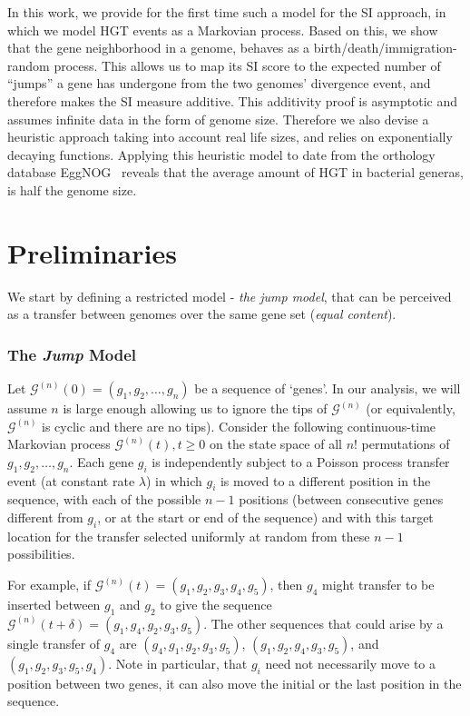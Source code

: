 \documentclass[runningheads, 11pt]{llncs}
\newcommand{\G}{\mathcal{G}^{(n)}}
\begin{document}
In this work, we provide for the first time such a model for the SI approach, in
which we model HGT events as a Markovian process. Based on this, we show that
the gene neighborhood in a genome, behaves as a birth/death/immigration-random
process. This allows us to map its SI score to the expected number of ``jumps''
a gene has undergone from the two genomes' divergence event, and therefore makes
the SI measure additive. This additivity proof is asymptotic and assumes
infinite data in the form of genome size. Therefore we also devise a heuristic
approach taking into account real life sizes, and relies on exponentially
decaying functions. Applying this heuristic model to date from the orthology
database EggNOG~\cite{Powell12} reveals that the average amount of HGT in
bacterial generas, is half the genome size.

\section{Preliminaries}
\label{sec-prelim}
We start by defining a restricted model - {\em the jump model}, that can be
perceived as a transfer between genomes over the same gene set ({\em equal
content}). \subsubsection{The {\em Jump} Model} Let $\G(0) = (g_1, g_2, \ldots,
g_n)$ be a sequence of `genes'. {In our analysis,} we will assume $n$ is large
enough allowing us to ignore the tips of $\G$ (or equivalently, $\G$ is cyclic
and there are no tips). Consider the following continuous-time Markovian process
$\G(t), t\geq 0$ on the state space of all $n!$ permutations of $g_1, g_2,
\ldots, g_n$. Each gene $g_i$ is independently subject to a Poisson process
transfer event (at constant rate $\lambda$) in which $g_i$ is moved to a
different position in the sequence, with each of the possible $n-1$ positions
(between consecutive genes different from $g_i$, or at the start or end of the
sequence) and with this target location for the transfer selected uniformly at
random from these $n-1$ possibilities. 


For example, if $\G(t)= (g_1, g_2, g_3, g_4, g_5)$, then $g_4$ might transfer to
be inserted between $g_1$ and $g_2$ to give the sequence $\G(t+\delta) = (g_1,
g_4, g_2, g_3, g_5)$. The other sequences that could arise by a single transfer
of $g_4$ are $(g_4, g_1, g_2, g_3, g_5)$, $(g_1, g_2, g_4, g_3, g_5)$, and
$(g_1, g_2, g_3, g_5, g_4)$. Note in particular, that $g_i$ need not necessarily
move to a position between two genes, it can also move the initial or the
last position in the sequence.
\end{document}
